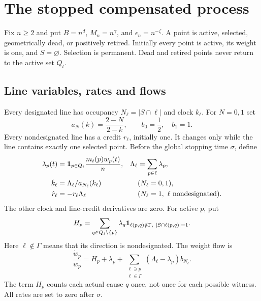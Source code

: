 \section{The stopped compensated process}\label{sec:process}

Fix \(n\ge2\) and put \(B=n^d\), \(M_n=n^\gamma\), and
\(\epsilon_n=n^{-\zeta}\). A point is active, selected, geometrically
dead, or positively retired. Initially every point is active, its weight
is one, and \(S=\varnothing\). Selection is permanent. Dead and retired
points never return to the active set \(Q_t\).

\subsection{Line variables, rates and flows}
Every designated line has occupancy \(N_\ell=|S\cap\ell|\) and clock
\(k_\ell\). For \(N=0,1\) set
\[
 a_N(k)=\frac{2-N}{2-k},\qquad b_0=\frac12,\quad b_1=1.
\]
Every nondesignated line has a credit \(r_\ell\), initially one.
It changes only while the line contains exactly one selected point.
Before the global stopping time \(\sigma\), define
\begin{align}
 \lambda_p(t)&=\mathbf 1_{p\in Q_t}\frac{m_t(p)w_p(t)}n,
 &\Lambda_\ell&=\sum_{p\in\ell}\lambda_p,\label{eq:rates}\\
 \dot k_\ell&=\Lambda_\ell/a_{N_\ell}(k_\ell)
       &&(N_\ell=0,1),\label{eq:clockflow}\\
 \dot r_\ell&=-r_\ell\Lambda_\ell
       &&(N_\ell=1,\ \ell\text{ nondesignated}).\label{eq:tagflow}
\end{align}
The other clock and line-credit derivatives are zero. For active \(p\),
put
\[
 H_p=\sum_{q\in Q_t\setminus\{p\}}\lambda_q
 \mathbf 1_{\ell(p,q)\notin\Gamma,\ |S\cap\ell(p,q)|=1}.
\]
Here \(\ell\notin\Gamma\) means that its direction is nondesignated.
The weight flow is
\begin{equation}\label{eq:weightflow}
 \frac{\dot w_p}{w_p}=H_p+\lambda_p+
 \sum_{\substack{\ell\ni p\\\ell\in\Gamma}}
 (\Lambda_\ell-\lambda_p)b_{N_\ell}.
\end{equation}
The term \(H_p\) counts each actual cause \(q\) once, not once for
each possible witness. All rates are set to zero after \(\sigma\).

